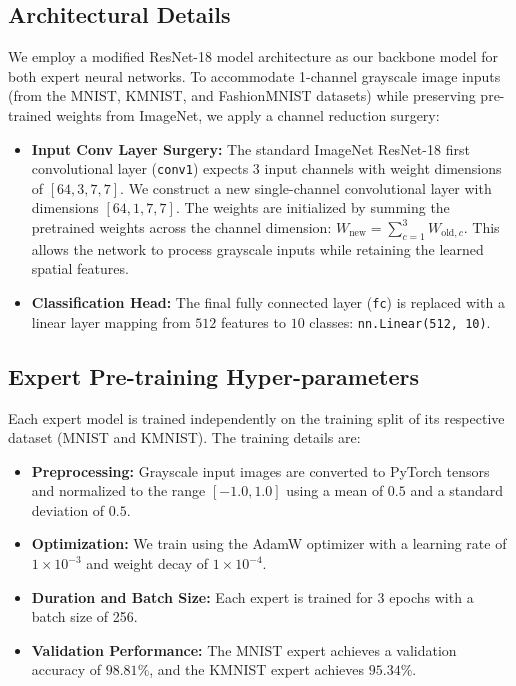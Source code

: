 \documentclass{article}
\theoremstyle{plain}
\theoremstyle{definition}
\theoremstyle{remark}
\begin{document}
\subsection{Architectural Details}
We employ a modified ResNet-18 model architecture \cite{He2016} as our backbone model for both expert neural networks. 
To accommodate 1-channel grayscale image inputs (from the MNIST, KMNIST, and FashionMNIST datasets) while preserving pre-trained weights from ImageNet, we apply a channel reduction surgery:
\begin{itemize}
    \item \textbf{Input Conv Layer Surgery:} The standard ImageNet ResNet-18 first convolutional layer (\texttt{conv1}) expects 3 input channels with weight dimensions of $[64, 3, 7, 7]$. We construct a new single-channel convolutional layer with dimensions $[64, 1, 7, 7]$. The weights are initialized by summing the pretrained weights across the channel dimension: $W_{\text{new}} = \sum_{c=1}^3 W_{\text{old}, c}$. This allows the network to process grayscale inputs while retaining the learned spatial features.
    \item \textbf{Classification Head:} The final fully connected layer (\texttt{fc}) is replaced with a linear layer mapping from $512$ features to $10$ classes: \texttt{nn.Linear(512, 10)}.
\end{itemize}

\subsection{Expert Pre-training Hyper-parameters}
Each expert model is trained independently on the training split of its respective dataset (MNIST and KMNIST). The training details are:
\begin{itemize}
    \item \textbf{Preprocessing:} Grayscale input images are converted to PyTorch tensors and normalized to the range $[-1.0, 1.0]$ using a mean of $0.5$ and a standard deviation of $0.5$.
    \item \textbf{Optimization:} We train using the AdamW optimizer with a learning rate of $1 \times 10^{-3}$ and weight decay of $1 \times 10^{-4}$.
    \item \textbf{Duration and Batch Size:} Each expert is trained for 3 epochs with a batch size of 256.
    \item \textbf{Validation Performance:} The MNIST expert achieves a validation accuracy of $98.81\%$, and the KMNIST expert achieves $95.34\%$.
\end{itemize}
\end{document}
